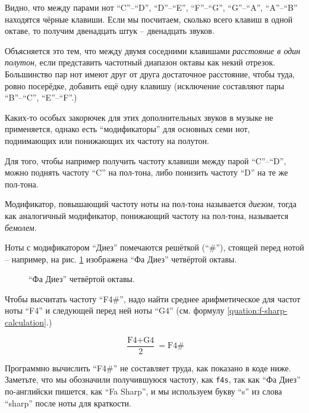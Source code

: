 \documentclass[a4paper,twoside]{book}
\begin{document}
Видно, что между парами нот ``C''--``D'', ``D''--``E'', ``F''--``G'',
``G''--``A'', ``A''--``B'' находятся чёрные клавиши. Если мы посчитаем, сколько
всего клавиш в одной октаве, то получим двенадцать штук -- двенадцать звуков.

Объясняется это тем, что между двумя соседними клавишами \emph{расстояние в один
полутон}, если представить частотный диапазон октавы как некий отрезок.
Большинство пар нот имеют друг от друга достаточное расстояние, чтобы туда,
ровно посерёдке, добавить ещё одну клавишу (исключение составляют пары
``B''--``C'', ``E''--``F''.)

Каких-то особых закорючек для этих дополнительных звуков в музыке не
применяется, однако есть ``модификаторы'' для основных семи нот, поднимающих или
понижающих их частоту на полутон.

Для того, чтобы например получить частоту клавиши между парой ``C''--``D'',
можно поднять частоту ``C'' на пол-тона, либо понизить частоту ``D'' на те же
пол-тона.

Модификатор, повышающий частоту ноты на пол-тона называется \emph{диезом}, тогда
как аналогичный модификатор, понижающий частоту на пол-тона, называется
\emph{бемолем}.

Ноты с модификатором ``Диез'' помечаются решёткой (``\#''), стоящей перед нотой
-- например, на рис. \ref{fig:lilypond-f4-sharp} изображена ``Фа Диез''
четвёртой октавы.

\begin{figure}[ht]
  \caption{``Фа Диез'' четвёртой октавы.}
  \centering
  \label{fig:lilypond-f4-sharp}
\end{figure}

Чтобы высчитать частоту ``F4\#'', надо найти среднее арифметическое для частот
ноты ``F4'' и следующей перед ней ноты ``G4'' (см. формулу
\ref{quation:f-sharp-calculation}.)

\begin{equation}
  \frac{\mbox{F4} + \mbox{G4}}{2} = \mbox{F4\#}
  \label{quation:f-sharp-calculation}
\end{equation}

Программно вычислить ``F4\#'' не составляет труда, как показано в коде ниже.
Заметьте, что мы обозначили получившуюся частоту, как \texttt{f4s}, так как ``Фа
Диез'' по-английски пишется, как ``Fa Sharp'', и мы используем букву ``s'' из
слова ``sharp'' после ноты для краткости.
\end{document}
